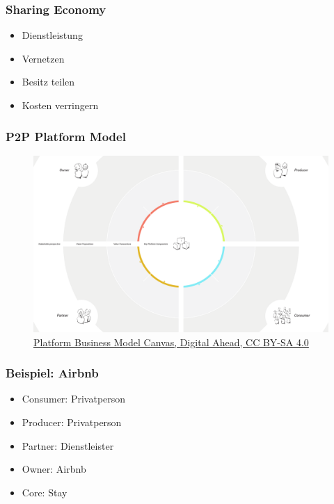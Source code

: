 \begin{frame}
	\frametitle{Sharing Economy}

	\begin{itemize}
		\item Dienstleistung
		\item Vernetzen
		\item Besitz teilen
		\item Kosten verringern
	\end{itemize}
\end{frame}

\begin{frame}
	\frametitle{P2P Platform Model}

	\begin{figure}
		\includegraphics[height=0.8\textheight]{img/platformbusinessmodelcanvas.png}
		\caption[Platform Business Model Canvas]{\href{https://www.creatlr.com/template/um2yxrXADndCd8ftsGgY2/platform-business-model-canvas/}{{Platform Business Model Canvas}, Digital Ahead, \href{http://creativecommons.org/licenses/by-sa/4.0/}{CC BY-SA 4.0}}}
	\end{figure}
\end{frame}
\note{}

\begin{frame}
	\frametitle{Beispiel: Airbnb}

	\begin{itemize}
		\item Consumer: Privatperson
		\item Producer: Privatperson
		\item Partner: Dienstleister
		\item Owner: Airbnb
		\item Core: Stay
	\end{itemize}
\end{frame}


